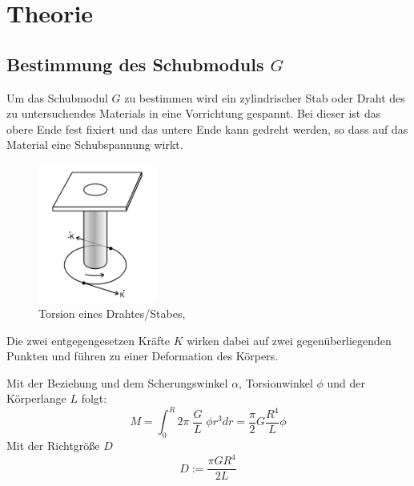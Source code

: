 \newpage
\section{Theorie}
\label{sec:theorie}

\subsection{Bestimmung des Schubmoduls $G$}
Um das Schubmodul $G$ zu bestimmen wird ein zylindrischer Stab oder Draht des zu untersuchendes
Materials in eine Vorrichtung gespannt. Bei dieser ist das obere Ende fest fixiert und das untere
Ende kann gedreht werden, so dass auf das Material eine Schubspannung wirkt.

\begin{figure}[h]
    \centering
    \includegraphics[width=0.35\textwidth, height=0.4\textwidth]{bilder/Torsion_allgemein.jpeg}
    \caption{Torsion eines Drahtes/Stabes,\cite[5]{Anleitung}}        
    \label{fig:torsion_allgemein}
\end{figure} 

Die zwei entgegengesetzen Kräfte $K$ wirken dabei auf zwei gegenüberliegenden Punkten 
und führen zu einer Deformation des Körpers.

Mit der Beziehung  %
und dem Scherungswinkel $\alpha$, Torsionwinkel $\phi$ 
und der Körperlange $L$ folgt:
\begin{equation}
    M = \int_{0}^{R} 2\pi\;\frac{G}{L}\;\phi r^3 dr = \frac{\pi}{2}G\frac{R^4}{L}\phi
\end{equation}
Mit der Richtgröße $D$
\begin{equation}
    D:=\frac{\pi G R^4}{2L}
    \label{eqn:richtgroesse}
\end{equation}

